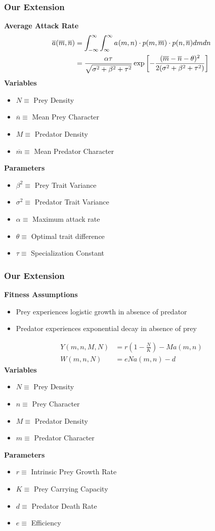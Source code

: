 \documentclass[10pt]{beamer}
\begin{document}
\begin{frame}
	\frametitle{Our Extension}
	{\bf Average Attack Rate}
	\begin{align*}
		\overline{a}(\overline{m}, \overline{n}) &= \int_{-\infty}^{\infty}\int_{\-\infty}^{\infty} a_{}(m, n) \cdot p(m, \overline{m}) \cdot p(n, \overline{n}) dm dn \\
		&= \frac{\alpha\tau}{\sqrt{\sigma^2 + \beta^2 + \tau^2}}\exp\left[{-\frac{(\overline{m} - \overline{n} - \theta)^2}{2(\sigma^2 + \beta^2 + \tau^2)}}\right]
	\end{align*}
	{\bf Variables}
	\begin{itemize}
		\item $N \equiv $ Prey Density
		\item $\overline{n} \equiv $ Mean Prey Character
		\item $M \equiv $ Predator Density
		\item $\overline{m} \equiv $ Mean Predator Character
	\end{itemize}
	{\bf Parameters}
	\begin{itemize}
		\item $\beta^2 \equiv $ Prey Trait Variance
		\item $\sigma^2 \equiv $ Predator Trait Variance
		\item $\alpha \equiv $ Maximum attack rate
		\item $\theta \equiv $ Optimal trait difference
		\item $\tau \equiv $ Specialization Constant
	\end{itemize}
\end{frame}
\begin{frame}
	\frametitle{Our Extension}
	{\bf Fitness Assumptions}
	\begin{itemize}
		\item Prey experiences logistic growth in absence of predator
		\item Predator experiences exponential decay in absence of prey
	\end{itemize}
	\begin{align*}
		Y(m, n, M, N) &= r\left(1 - \frac{N}{K}\right) - Ma(m, n) \\[.1cm]
		W(m, n, N) &= eNa(m, n) - d
	\end{align*}
	{\bf Variables}
	\begin{itemize}
		\item $N \equiv $ Prey Density
		\item $n \equiv $ Prey Character
		\item $M \equiv $ Predator Density
		\item $m \equiv $ Predator Character
	\end{itemize}
	{\bf Parameters}
	\begin{itemize}
		\item $r \equiv $ Intrinsic Prey Growth Rate
		\item $K \equiv $ Prey Carrying Capacity
		\item $d \equiv $ Predator Death Rate
		\item $e \equiv $ Efficiency
	\end{itemize}
\end{frame}
\end{document}
